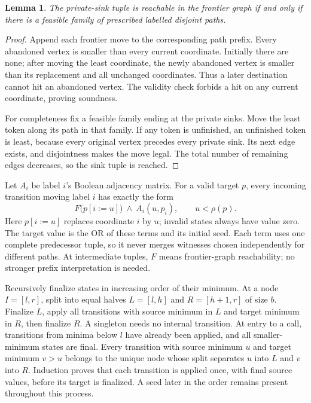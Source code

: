 \documentclass[acmlarge,11pt,screen,nonacm]{acmart}
\newtheorem{lemma}[theorem]{Lemma}
\newcommand{\rh}{\rho}
\begin{document}
\begin{lemma}\label{lem:semantics}
The private-sink tuple is reachable in the frontier graph if and only if
there is a feasible family of prescribed labelled disjoint paths.
\end{lemma}
\begin{proof}
Append each frontier move to the corresponding path prefix. Every abandoned
vertex is smaller than every current coordinate. Initially there are none;
after moving the least coordinate, the newly abandoned vertex is smaller
than its replacement and all unchanged coordinates. Thus a later destination
cannot hit an abandoned vertex. The validity check forbids a hit on any
current coordinate, proving soundness.

For completeness fix a feasible family ending at the private sinks. Move
the least token along its path in that family. If any token is unfinished,
an unfinished token is least, because every original vertex precedes every
private sink. Its next edge exists, and disjointness makes the move legal.
The total number of remaining edges decreases, so the sink tuple is reached.
\end{proof}

Let $A_i$ be label $i$'s Boolean adjacency matrix. For a valid target $p$,
every incoming transition moving label $i$ has exactly the form
\begin{equation}\label{eq:recurrence}
 F\bigl(p[i\!:=\!u]\bigr)\ \wedge\ A_i(u,p_i),
 \qquad u<\rh(p).
\end{equation}
Here $p[i\!:=\!u]$ replaces coordinate $i$ by $u$; invalid states always
have value zero. The target value is the OR of these terms and its initial
seed. Each term uses one complete predecessor tuple, so it never merges
witnesses chosen independently for different paths. At intermediate tuples,
$F$ means frontier-graph reachability; no stronger prefix interpretation
is needed.

Recursively finalize states in increasing order of their minimum. At a node
$I=[l,r]$, split into equal halves $L=[l,h]$ and $R=[h+1,r]$ of size $b$.
Finalize $L$, apply all transitions with source minimum in $L$ and target
minimum in $R$, then finalize $R$. A singleton needs no internal transition.
At entry to a call, transitions from minima below $l$ have already been
applied, and all smaller-minimum states are final. Every transition with
source minimum $u$ and target minimum $v>u$ belongs to the unique node whose
split separates $u$ into $L$ and $v$ into $R$. Induction proves that each
transition is applied once, with final source values, before its target is
finalized. A seed later in the order remains present throughout this process.
\end{document}
